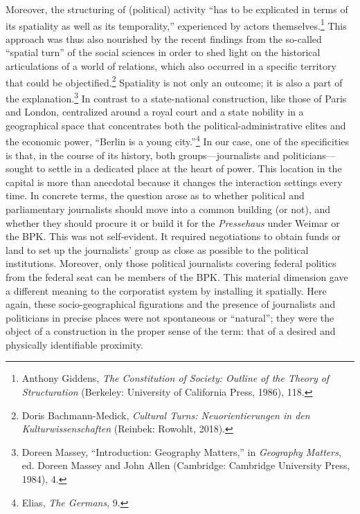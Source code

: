\documentclass{tufte-handout}
\begin{document}
Moreover, the structuring of (political) activity ``has to be explicated
in terms of its spatiality as well as its temporality,'' experienced by
actors themselves.\footnote{Anthony Giddens, \emph{The Constitution of
  Society: Outline of the Theory of Structuration} (Berkeley: University
  of California Press, 1986), 118.} This approach was thus also
nourished by the recent findings from the so-called ``spatial turn'' of
the social sciences in order to shed light on the historical
articulations of a world of relations, which also occurred in a specific
territory that could be objectified.\footnote{Doris Bachmann-Medick,
  \emph{Cultural Turns: Neuorientierungen in den Kulturwissenschaften}
  (Reinbek: Rowohlt, 2018).} Spatiality is not only an outcome; it is
also a part of the explanation.\footnote{Doreen Massey, ``Introduction:
  Geography Matters,'' in \emph{Geography Matters}, ed. Doreen Massey
  and John Allen (Cambridge: Cambridge University Press, 1984), 4.} In
contrast to a state-national construction, like those of Paris and
London, centralized around a royal court and a state nobility in a
geographical space that concentrates both the political-administrative
elites and the economic power, ``Berlin is a young city.''\footnote{Elias,
  \emph{The Germans}, 9.} In our case, one of the specificities is that,
in the course of its history, both groups---journalists and
politicians---sought to settle in a dedicated place at the heart of
power. This location in the capital is more than anecdotal because it
changes the interaction settings every time. In concrete terms, the
question arose as to whether political and parliamentary journalists
should move into a common building (or not), and whether they should
procure it or build it for the \emph{Pressehaus} under Weimar or the
BPK. This was not self-evident. It required negotiations to obtain funds
or land to set up the journalists' group as close as possible to the
political institutions. Moreover, only those political journalists
covering federal politics from the federal seat can be members of the
BPK. This material dimension gave a different meaning to the corporatist
system by installing it spatially. Here again, these socio-geographical
figurations and the presence of journalists and politicians in precise
places were not spontaneous or ``natural''; they were the object of a
construction in the proper sense of the term: that of a desired and
physically identifiable proximity.
\end{document}
